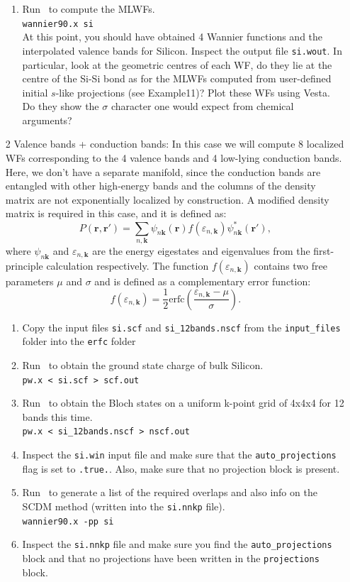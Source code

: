 \documentclass[a4paper,11pt,twoside]{article}
\begin{document}
\begin{itemize}
\begin{enumerate}
    \item Run \wannier\ to compute the MLWFs.\\
    {\tt wannier90.x si}\\
    At this point, you should have obtained 4 Wannier functions and the interpolated valence bands for Silicon. Inspect the output file {\tt si.wout}. In particular, look at the geometric centres of each WF, do they lie at the centre of the Si-Si bond as for the MLWFs computed from user-defined initial $s$-like projections (see Example11)?
    Plot these WFs using Vesta. Do they show the $\sigma$ character one would expect from chemical arguments?
  \end{enumerate}
  \item[2]{Valence bands + conduction bands: In this case we will compute 8 localized WFs corresponding to the 4 valence bands and 4 low-lying conduction bands. Here, we don't have a separate manifold, since the conduction bands are entangled with other high-energy bands and the columns of the density matrix are not exponentially localized by construction. A modified density matrix is required in this case\cite{LinLin-ArXiv2017}, and it is defined as: $$P(\mathbf{r},\mathbf{r}') = \sum_{n,\mathbf{k}} \psi_{n\mathbf{k}}(\mathbf{r})f(\varepsilon_{n,\mathbf{k}})\psi_{n\mathbf{k}}^\ast(\mathbf{r}'),$$
  where $\psi_{n\mathbf{k}}$ and $\varepsilon_{n,\mathbf{k}}$ are the energy eigestates and eigenvalues from the first-principle calculation respectively. The function $f(\varepsilon_{n,\mathbf{k}})$ contains two free parameters $\mu$ and $\sigma$ and is defined as a complementary error function: $$f(\varepsilon_{n,\mathbf{k}}) = \frac{1}{2}\mathrm{erfc}\left(\frac{\varepsilon_{n,\mathbf{k}} - \mu}{\sigma}\right).$$ }
  \begin{enumerate}
    \item Copy the input files {\tt si.scf} and {\tt si\_12bands.nscf} from the {\tt input\_files} folder into the {\tt erfc} folder
    \item Run \pwscf\ to obtain the ground state charge of bulk Silicon. \\
    {\tt pw.x < si.scf > scf.out}

    \item Run \pwscf\ to obtain the Bloch states on a uniform k-point grid of 4x4x4 for 12 bands this time. \\
    {\tt pw.x < si\_12bands.nscf > nscf.out}
    
    \item Inspect the {\tt si.win} input file and make sure that the {\tt auto\_projections} flag is set to {\tt .true.}. Also, make sure that no projection block is present.
    \item Run \wannier\ to generate a list of the required overlaps and also info on the SCDM method (written
    into the {\tt si.nnkp} file).\\ 
    {\tt wannier90.x -pp si}
    \item Inspect the {\tt si.nnkp} file and make sure you find the {\tt auto\_projections} block and that no projections have been written in the {\tt projections} block.


\end{enumerate}
\end{itemize}
\end{document}
